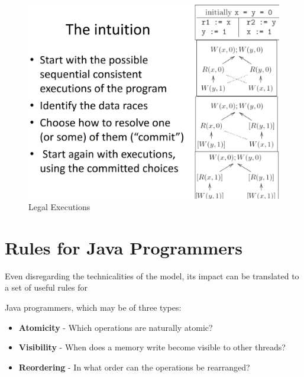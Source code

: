 \begin{figure}[htbp]
   \centering
   \includegraphics{images/legal_executions.png}
   \caption{Legal Executions}
   \label{fig:legal_executions}
\end{figure}

\section{Rules for Java Programmers}
Even disregarding the technicalities of the model, its
impact can be translated to a set of useful rules for
{Java programmers, which may be of three types:\ns
\begin{itemize}
	\item \textbf{Atomicity} - Which operations are naturally atomic?
	\item \textbf{Visibility} - When does a memory write become
visible to other threads?
	\item \textbf{Reordering} - In what order can the operations be
rearranged?
\end{itemize}}

